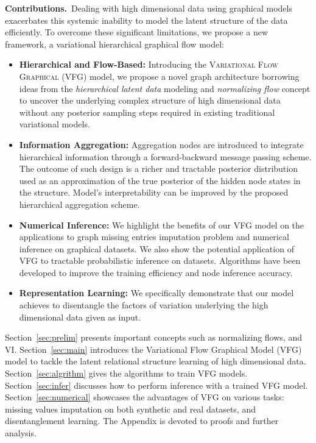 \documentclass{article}
\begin{document}
\textbf{Contributions.}\ Dealing with high dimensional data using graphical models exacerbates this systemic inability to model the latent structure of the data efficiently.
To overcome these significant limitations, we propose a new framework, a variational hierarchical graphical flow model:
\begin{itemize}
    \item \textbf{Hierarchical and Flow-Based:} Introducing the \textsc{Variational Flow Graphical (VFG)} model, we propose a novel graph architecture borrowing ideas from the \emph{hierarchical latent data} modeling and \emph{normalizing flow} concept to uncover the underlying complex structure of high dimensional data without any posterior sampling steps required in existing traditional variational models. 
    
    \item \textbf{Information Aggregation:} Aggregation nodes are introduced to integrate hierarchical information through a forward-backward message passing scheme.  
          The outcome of such design is a richer and tractable posterior distribution used as an approximation of the true posterior of the hidden node states in the structure. Model's interpretability can be improved by the proposed hierarchical aggregation scheme. 

    \item \textbf{Numerical Inference:} We highlight the benefits of our VFG model on  the applications to graph missing entries imputation problem and numerical inference on  graphical datasets. We also show the potential application of VFG to tractable probabilistic inference on datasets. Algorithms have been developed to improve the training efficiency and node inference accuracy.    
    
    \item \textbf{Representation Learning:} We specifically demonstrate that our model achieves to disentangle the factors of variation underlying the high dimensional data given as input.
\end{itemize}

Section~\ref{sec:prelim} presents important concepts such as normalizing flows, and VI.
Section~\ref{sec:main} introduces the Variational Flow Graphical Model (VFG) model to tackle the latent relational structure learning of high dimensional data.
Section~\ref{sec:algrithm} gives the algorithms to train VFG models. Section~\ref{sec:infer} discusses how to perform inference with a trained VFG model. 
Section~\ref{sec:numerical} showcases the advantages of VFG on various tasks: missing values imputation on both synthetic and real datasets, and disentanglement learning.
The Appendix is devoted to proofs and further analysis. 
\end{document}

